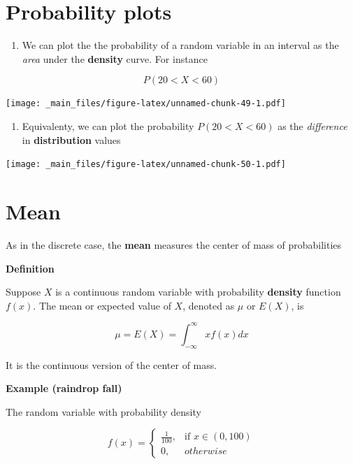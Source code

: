 \documentclass[
]{book}
\providecommand{\tightlist}{%
  \setlength{\itemsep}{0pt}\setlength{\parskip}{0pt}}
\begin{document}
\newpage

\hypertarget{probability-plots}{%
\section{Probability plots}\label{probability-plots}}

\begin{enumerate}
\def\labelenumi{\arabic{enumi})}
\tightlist
\item
  We can plot the the probability of a random variable in an interval as the \emph{area} under the \textbf{density} curve. For instance
\end{enumerate}

\[P(20<X<60)\]

\texttt{[image: \_main\_files/figure-latex/unnamed-chunk-49-1.pdf]}

\begin{enumerate}
\def\labelenumi{\arabic{enumi})}
\setcounter{enumi}{1}
\tightlist
\item
  Equivalenty, we can plot the probability \(P(20<X<60)\) as the \emph{difference} in \textbf{distribution} values
\end{enumerate}

\texttt{[image: \_main\_files/figure-latex/unnamed-chunk-50-1.pdf]}

\hypertarget{mean}{%
\section{Mean}\label{mean}}

As in the discrete case, the \textbf{mean} measures the center of mass of probabilities

\textbf{Definition}

Suppose \(X\) is a continuous random variable with probability \textbf{density} function \(f(x)\). The mean or expected value of \(X\), denoted as \(\mu\) or \(E(X)\), is

\[\mu=E(X)=\int_{-\infty}^\infty x f(x) dx\]

It is the continuous version of the center of mass.

\textbf{Example (raindrop fall)}

The random variable with probability density

\[
    f(x)= 
\begin{cases}
    \frac{1}{100},& \text{if } x\in (0,100)\\
    0,& otherwise 
\end{cases}
\]
\end{document}
